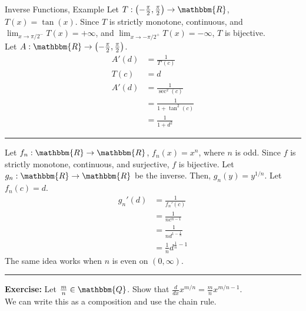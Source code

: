\documentclass[10pt]{extarticle}
\newcommand{\Q}{\mathbbm{Q}}
\newcommand{\R}{\mathbbm{R}}
\begin{document}
  \begin{problem}{Inverse Functions, Example}
    Let $T: \left(-\frac{\pi}{2},\frac{\pi}{2}\right)\rightarrow \R$, $T(x) = \tan(x)$. Since $T$ is strictly monotone, continuous, and $\lim_{x\rightarrow \pi/2^{-}}T(x) = +\infty$, and $\lim_{x\rightarrow -\pi/2^{+}}T(x) = -\infty$, $T$ is bijective.\\

    Let $A: \R\rightarrow \left(-\frac{\pi}{2},\frac{\pi}{2}\right)$. 
    \begin{align*}
      A'(d) &= \frac{1}{T'(c)}\\
      T(c) &= d\\
      A'(d) &= \frac{1}{\sec^2(c)}\\
            &=\frac{1}{1 + \tan^{2}(c)}\\
            &=\frac{1}{1+d^2}
    \end{align*}
    \vspace{4pt}
    \rule{\textwidth}{0.4pt}
    \vspace{4pt}
    Let $f_n: \R\rightarrow\R$, $f_n(x) = x^n$, where $n$ is odd. Since $f$ is strictly monotone, continuous, and surjective, $f$ is bijective. Let $g_n: \R\rightarrow \R$ be the inverse. Then, $g_n(y) = y^{1/n}$. Let $f_n(c) = d$.
    \begin{align*}
      g_n'(d) &= \frac{1}{f_n'(c)}\\
              &= \frac{1}{nc^{n-1}}\\
              &= \frac{1}{nd^{1-\frac{1}{n}}}\\
              &= \frac{1}{n}d^{\frac{1}{n}-1}
    \end{align*}
    The same idea works when $n$ is even on $(0,\infty)$.\\
    \vspace{4pt}
    \rule{\textwidth}{0.4pt}
    \vspace{4pt}
    \textbf{Exercise:} Let $\frac{m}{n}\in\Q$. Show that $\frac{d}{dx}x^{m/n} = \frac{m}{n}x^{m/n-1}$.\\

    We can write this as a composition and use the chain rule.
  \end{problem}
\end{document}
